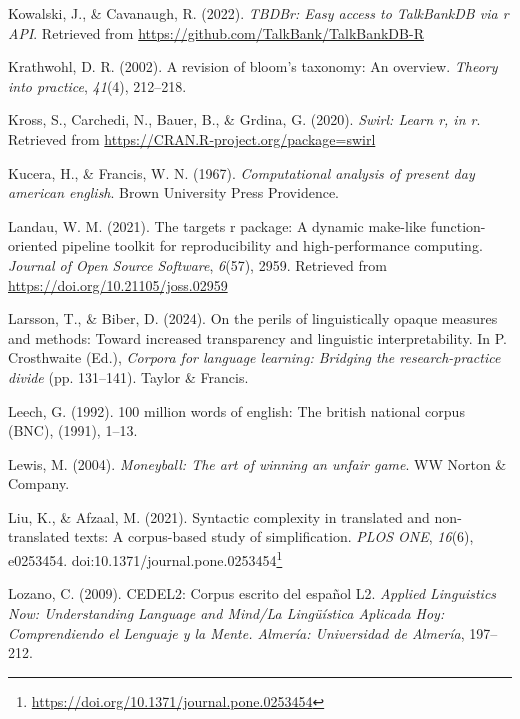 \documentclass[
  letterpaper,
]{latex/krantz}
\newlength{\cslhangindent}
\newenvironment{CSLReferences}[2] %
 {\begin{list}{}{%
  \setlength{\itemindent}{0pt}
  \setlength{\leftmargin}{0pt}
  \setlength{\parsep}{0pt}
  \ifodd #1
   \setlength{\leftmargin}{\cslhangindent}
   \setlength{\itemindent}{-1\cslhangindent}
  \fi
  \setlength{\itemsep}{#2\baselineskip}}}
 {\end{list}}
\theoremstyle{definition}
\theoremstyle{remark}
\DeclareRobustCommand{\href}[2]{#2\footnote{\url{#1}}}
\begin{document}
\begin{CSLReferences}{1}{0}
Kowalski, J., \& Cavanaugh, R. (2022). \emph{TBDBr: Easy access to
TalkBankDB via r API}. Retrieved from
\url{https://github.com/TalkBank/TalkBankDB-R}

Krathwohl, D. R. (2002). A revision of bloom's taxonomy: An overview.
\emph{Theory into practice}, \emph{41}(4), 212--218.

Kross, S., Carchedi, N., Bauer, B., \& Grdina, G. (2020). \emph{Swirl:
Learn r, in r}. Retrieved from
\url{https://CRAN.R-project.org/package=swirl}

Kucera, H., \& Francis, W. N. (1967). \emph{Computational analysis of
present day american english}. Brown University Press Providence.

Landau, W. M. (2021). The targets r package: A dynamic make-like
function-oriented pipeline toolkit for reproducibility and
high-performance computing. \emph{Journal of Open Source Software},
\emph{6}(57), 2959. Retrieved from
\url{https://doi.org/10.21105/joss.02959}

Larsson, T., \& Biber, D. (2024). On the perils of linguistically opaque
measures and methods: Toward increased transparency and linguistic
interpretability. In P. Crosthwaite (Ed.), \emph{Corpora for language
learning: Bridging the research-practice divide} (pp. 131--141). Taylor
\& Francis.

Leech, G. (1992). 100 million words of english: The british national
corpus (BNC), (1991), 1--13.

Lewis, M. (2004). \emph{Moneyball: The art of winning an unfair game}.
WW Norton \& Company.

Liu, K., \& Afzaal, M. (2021). Syntactic complexity in translated and
non-translated texts: A corpus-based study of simplification. \emph{PLOS
ONE}, \emph{16}(6), e0253454.
doi:\href{https://doi.org/10.1371/journal.pone.0253454}{10.1371/journal.pone.0253454}

Lozano, C. (2009). CEDEL2: Corpus escrito del espa{ñ}ol L2.
\emph{Applied Linguistics Now: Understanding Language and Mind/La
Ling{ü}{í}stica Aplicada Hoy: Comprendiendo el Lenguaje y la Mente.
Almer{í}a: Universidad de Almer{í}a}, 197--212.


\end{CSLReferences}
\end{document}
